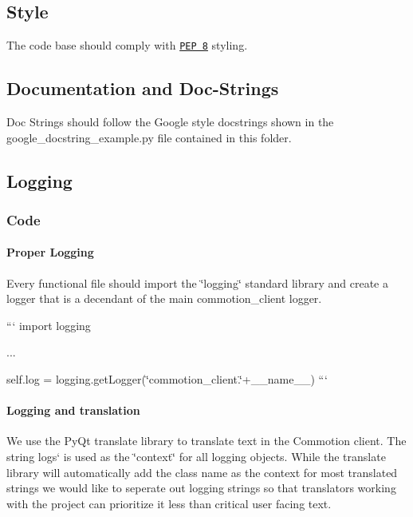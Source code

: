 \subsection*{Style}

The code base should comply with \href{http://legacy.python.org/dev/peps/pep-0008/}{\tt P\+E\+P 8} styling.

\subsection*{Documentation and Doc-\/\+Strings}

Doc Strings should follow the Google style docstrings shown in the google\+\_\+docstring\+\_\+example.\+py file contained in this folder.

\subsection*{Logging}

\subsubsection*{Code}

\paragraph*{Proper Logging}

Every functional file should import the \char`\"{}logging\char`\"{} standard library and create a logger that is a decendant of the main commotion\+\_\+client logger.

``` import logging

...

self.\+log = logging.\+get\+Logger(\char`\"{}commotion\+\_\+client.\char`\"{}+\+\_\+\+\_\+name\+\_\+\+\_\+) ```

\paragraph*{Logging and translation}

We use the Py\+Qt translate library to translate text in the Commotion client. The string {\ttfamily logs}` is used as the \char`\"{}context\char`\"{} for all logging objects. While the translate library will automatically add the class name as the context for most translated strings we would like to seperate out logging strings so that translators working with the project can prioritize it less than critical user facing text.

